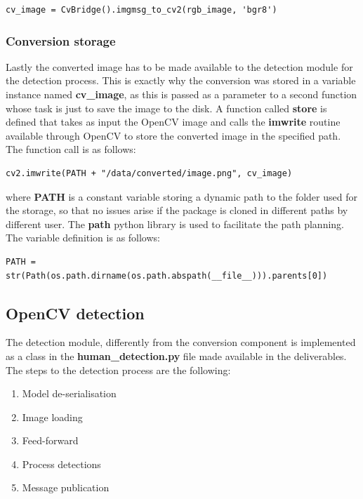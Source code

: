 \begin{lstlisting}
cv_image = CvBridge().imgmsg_to_cv2(rgb_image, 'bgr8')
\end{lstlisting}

\subsubsection{Conversion storage}

Lastly the converted image has to be made available to the detection module for the detection process. This is exactly why the conversion was stored in a variable instance named \textbf{cv\_image}, as this is passed as a parameter to a second function whose task is just to save the image to the disk. A function called \textbf{store} is defined that takes as input the OpenCV image and calls the \textbf{imwrite} routine available through OpenCV to store the converted image in the specified path. The function call is as follows:

\begin{lstlisting}
cv2.imwrite(PATH + "/data/converted/image.png", cv_image)
\end{lstlisting}

where \textbf{PATH} is a constant variable storing a dynamic path to the folder used for the storage, so that no issues arise if the package is cloned in different paths by different user. The \textbf{path} python library is used to facilitate the path planning. The variable definition is as follows:

\begin{lstlisting}
PATH = str(Path(os.path.dirname(os.path.abspath(__file__))).parents[0])
\end{lstlisting}

\subsection{OpenCV detection}

The detection module, differently from the conversion component is implemented as a class in the \textbf{human\_detection.py} file made available in the deliverables. The steps to the detection process are the following:

\begin{enumerate}
  \item Model de-serialisation
  \item Image loading
  \item Feed-forward
  \item Process detections
  \item Message publication
\end{enumerate}

